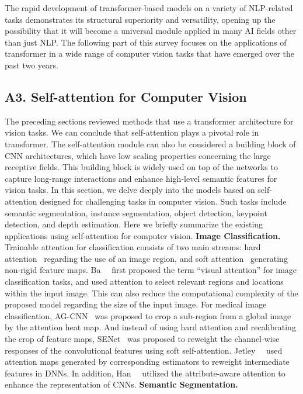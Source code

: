 The rapid development of transformer-based models on a variety of NLP-related tasks demonstrates its structural superiority and versatility, opening up the possibility that it will become a universal module applied in many AI fields other than just NLP. The following part of this survey focuses on the applications of transformer in a wide range of computer vision tasks that have emerged over the past two years.
\subsection*{A3. Self-attention for Computer Vision}\label{subsec:selfatt}
The preceding sections reviewed methods that use a transformer architecture for vision tasks. We can conclude that self-attention plays a pivotal role in transformer. The self-attention module can also be considered a building block of CNN architectures, which have low scaling properties concerning the large receptive fields. This building block is widely used on top of the networks to capture long-range interactions and enhance high-level semantic features for vision tasks. In this section, we delve deeply into the models based on self-attention designed for challenging tasks in computer vision. Such tasks include semantic segmentation, instance segmentation, object detection, keypoint detection, and depth estimation. Here we briefly summarize the existing applications using self-attention for computer vision.
\textbf{Image Classification.}
Trainable attention for classification consists of two main streams: hard attention~ regarding the use of an image region, and soft attention~ generating non-rigid feature maps. Ba~\etal~ first proposed the term ``visual attention'' for image classification tasks, and used attention to select relevant regions and locations within the input image. This can also reduce the computational complexity of the proposed model regarding the size of the input image. For medical image classification, AG-CNN~ was proposed to crop a sub-region from a global image by the attention heat map. And instead of using hard attention and recalibrating the crop of feature maps, SENet~ was proposed to reweight the channel-wise responses of the convolutional features using soft self-attention. Jetley~\etal~ used attention maps generated by corresponding estimators to reweight intermediate features in DNNs. In addition, Han~\etal~ utilized the attribute-aware attention to enhance the representation of CNNs.
\textbf{Semantic Segmentation.}
